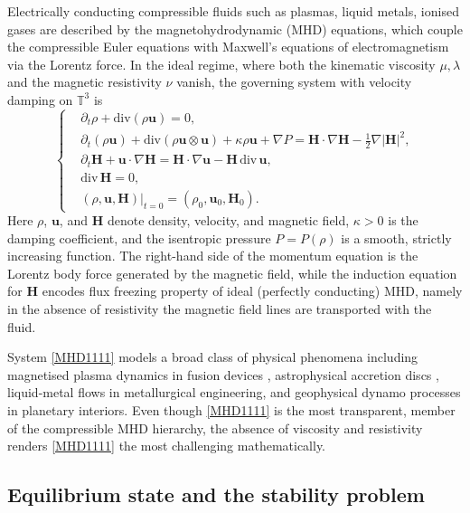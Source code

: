 \documentclass[12pt, reqno]{amsart}
\numberwithin{equation}{section}
\numberwithin{equation}{section}
\numberwithin{equation}{section}
\numberwithin{equation}{section}
\theoremstyle{remark}
\begin{document}
\medskip
Electrically conducting compressible fluids such as plasmas, liquid metals,
ionised gases are described by the magnetohydrodynamic (MHD)
equations, which couple the compressible Euler equations with Maxwell's
equations of electromagnetism via the Lorentz force.  In the
ideal regime, where both the kinematic
viscosity $\mu, \lambda$ and the magnetic resistivity $\nu$ vanish, the
governing system with velocity damping on $\mathbb{T}^3$ is
\begin{equation}\label{MHD1111}
	\left\{
	\begin{aligned}
		&\partial_t \rho + \mathrm{div}(\rho \mathbf{u}) = 0, \\
		&\partial_t(\rho \mathbf{u}) + \mathrm{div}(\rho\mathbf{u}\otimes\mathbf{u})
		+ \kappa\rho\mathbf{u} + \nabla P
		= \mathbf{H}\cdot\nabla\mathbf{H} - \tfrac{1}{2}\nabla|\mathbf{H}|^2, \\
		&\partial_t\mathbf{H} + \mathbf{u}\cdot\nabla\mathbf{H}
		= \mathbf{H}\cdot\nabla\mathbf{u} - \mathbf{H}\,\mathrm{div}\,\mathbf{u}, \\
		&\mathrm{div}\,\mathbf{H} = 0, \\
		&(\rho,\mathbf{u},\mathbf{H})|_{t=0} = (\rho_0,\mathbf{u}_0,\mathbf{H}_0).
	\end{aligned}
	\right.
\end{equation}
Here $\rho$, $\mathbf{u}$, and $\mathbf{H}$ denote density, velocity, and
magnetic field, $\kappa>0$ is the damping coefficient, and the isentropic
pressure $P=P(\rho)$ is a smooth, strictly increasing function.  The
right-hand side of the momentum equation is the Lorentz body force
generated by the magnetic field, while the induction equation for
$\mathbf{H}$ encodes flux freezing property of ideal
(perfectly conducting) MHD, namely in the absence of resistivity the magnetic
field lines are transported with the fluid.

\medskip
System \eqref{MHD1111} models a broad class of physical phenomena including
magnetised plasma dynamics in fusion devices
\cite{Cabannes-H,Landau-Lifshitz}, astrophysical accretion discs
\cite{Polovin-Demutskii}, liquid-metal flows in metallurgical
engineering, and geophysical dynamo processes in planetary interiors.
Even though \eqref{MHD1111} is the most transparent,
member of the compressible MHD hierarchy, the absence of viscosity and resistivity renders  \eqref{MHD1111} the most
challenging mathematically.

\subsection{Equilibrium state and the stability problem}
\end{document}
